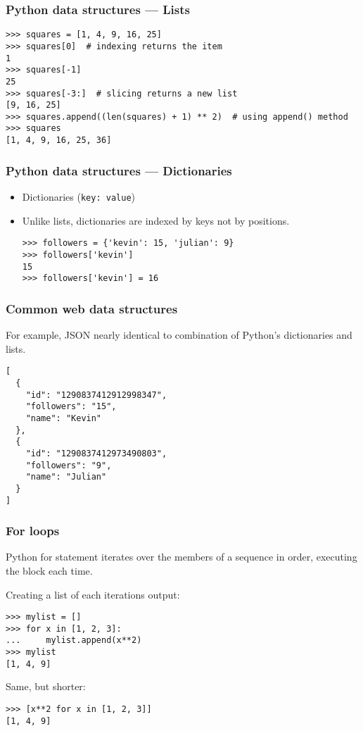 \begin{frame}[fragile]
    \frametitle{Python data structures --- Lists}
\begin{verbatim}
>>> squares = [1, 4, 9, 16, 25]
>>> squares[0]  # indexing returns the item
1
>>> squares[-1]
25
>>> squares[-3:]  # slicing returns a new list
[9, 16, 25]
>>> squares.append((len(squares) + 1) ** 2)  # using append() method
>>> squares
[1, 4, 9, 16, 25, 36]
\end{verbatim}
\end{frame}

\begin{frame}[fragile]
    \frametitle{Python data structures --- Dictionaries}
    \begin{itemize}
        \item Dictionaries (\texttt{key: value})\\
        \item Unlike lists, dictionaries are indexed by keys not by positions.
\begin{verbatim}
>>> followers = {'kevin': 15, 'julian': 9}
>>> followers['kevin']
15
>>> followers['kevin'] = 16
\end{verbatim}
    \end{itemize}
\end{frame}

\begin{frame}[fragile]
    \frametitle{Common web data structures}
        For example, JSON nearly identical to combination of Python's dictionaries and lists.
\begin{verbatim}
[
  {
    "id": "1290837412912998347",
    "followers": "15",
    "name": "Kevin"
  },
  {
    "id": "1290837412973490803",
    "followers": "9",
    "name": "Julian"
  }
]
\end{verbatim}
\end{frame}

\begin{frame}[fragile]
    \frametitle{For loops}

    Python for statement iterates over the members of a sequence in
    order, executing the block each time.

    Creating a list of each iterations output:

    \begin{verbatim}
>>> mylist = []
>>> for x in [1, 2, 3]:
...     mylist.append(x**2)
>>> mylist
[1, 4, 9]
\end{verbatim}

    Same, but shorter:

\begin{verbatim}
>>> [x**2 for x in [1, 2, 3]]
[1, 4, 9]
\end{verbatim}
\end{frame}

